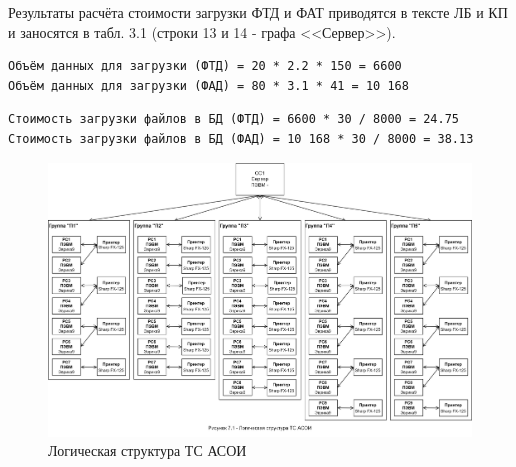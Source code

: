 \documentclass[12pt, a4paper, simple]{eskdtext}
\begin{document}
    Результаты расчёта стоимости загрузки ФТД и ФАТ приводятся в тексте ЛБ и КП и заносятся в табл. 3.1
    (строки 13 и 14 - графа <<Сервер>>).
    
    \begin{lstlisting}[language=MyFormula]
Объём данных для загрузки (ФТД) = 20 * 2.2 * 150 = 6600
Объём данных для загрузки (ФАД) = 80 * 3.1 * 41 = 10 168
\end{lstlisting}

\begin{lstlisting}[language=MyFormula]
Стоимость загрузки файлов в БД (ФТД) = 6600 * 30 / 8000 = 24.75
Стоимость загрузки файлов в БД (ФАД) = 10 168 * 30 / 8000 = 38.13
\end{lstlisting}

    \newpage

    \begin{figure}[h!]
        \centering
        \includegraphics[width=16cm]
            {_docs/Рисунок7-1ЛогическаяСтруктураТСАСОИ.png}
        \caption{Логическая структура ТС АСОИ}
    \end{figure}


%     


\end{document}

